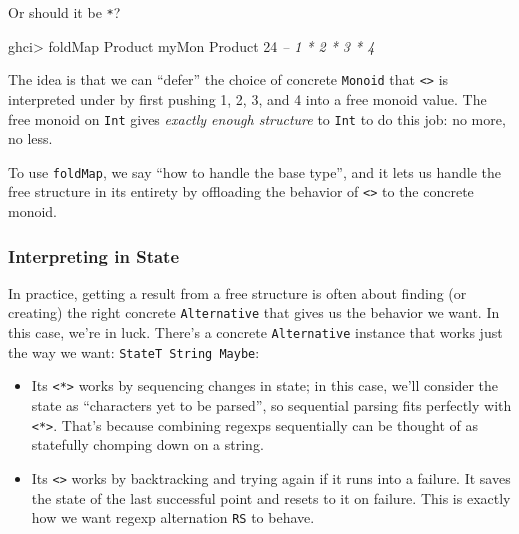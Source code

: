 \documentclass[]{article}
\newenvironment{Shaded}{}{}
\newcommand{\CommentTok}[1]{\textcolor[rgb]{0.38,0.63,0.69}{\textit{#1}}}
\newcommand{\DataTypeTok}[1]{\textcolor[rgb]{0.56,0.13,0.00}{#1}}
\newcommand{\DecValTok}[1]{\textcolor[rgb]{0.25,0.63,0.44}{#1}}
\newcommand{\FunctionTok}[1]{\textcolor[rgb]{0.02,0.16,0.49}{#1}}
\newcommand{\NormalTok}[1]{#1}
\begin{document}
Or should it be \texttt{*}?

\begin{Shaded}
\begin{Highlighting}[]
\NormalTok{ghci}\FunctionTok{>} \FunctionTok{foldMap} \DataTypeTok{Product}\NormalTok{ myMon}
\DataTypeTok{Product} \DecValTok{24}          \CommentTok{-- 1 * 2 * 3 * 4}
\end{Highlighting}
\end{Shaded}

The idea is that we can ``defer'' the choice of concrete \texttt{Monoid} that
\texttt{\textless{}\textgreater{}} is interpreted under by first pushing 1, 2,
3, and 4 into a free monoid value. The free monoid on \texttt{Int} gives
\emph{exactly enough structure} to \texttt{Int} to do this job: no more, no
less.

To use \texttt{foldMap}, we say ``how to handle the base type'', and it lets us
handle the free structure in its entirety by offloading the behavior of
\texttt{\textless{}\textgreater{}} to the concrete monoid.

\hypertarget{interpreting-in-state}{%
\subsubsection{Interpreting in State}\label{interpreting-in-state}}

In practice, getting a result from a free structure is often about finding (or
creating) the right concrete \texttt{Alternative} that gives us the behavior we
want. In this case, we're in luck. There's a concrete \texttt{Alternative}
instance that works just the way we want: \texttt{StateT\ String\ Maybe}:

\begin{itemize}
\tightlist
\item
  Its \texttt{\textless{}*\textgreater{}} works by sequencing changes in state;
  in this case, we'll consider the state as ``characters yet to be parsed'', so
  sequential parsing fits perfectly with \texttt{\textless{}*\textgreater{}}.
  That's because combining regexps sequentially can be thought of as statefully
  chomping down on a string.
\item
  Its \texttt{\textless{}\textbar{}\textgreater{}} works by backtracking and
  trying again if it runs into a failure. It saves the state of the last
  successful point and resets to it on failure. This is exactly how we want
  regexp alternation \texttt{R\textbar{}S} to behave.
\end{itemize}
\end{document}
